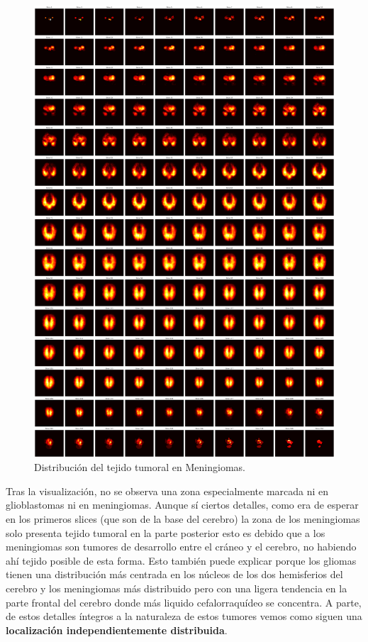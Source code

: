 \begin{figure}[H]
	\centering
	\includegraphics[width=1.0\linewidth]{imagenes/metodologia_heatmapsMEN.png}
	\caption{Distribución del tejido tumoral en Meningiomas.}
\end{figure}


Tras la visualización, no se observa una zona especialmente marcada ni en glioblastomas ni en meningiomas. Aunque sí ciertos detalles, como era de esperar en los primeros slices (que son de la base del cerebro) la zona de los meningiomas solo presenta tejido tumoral en la parte posterior esto es debido que a los meningiomas son tumores de desarrollo entre el cráneo y el cerebro, no habiendo ahí tejido posible de esta forma. Esto también puede explicar porque los gliomas tienen una distribución más centrada en los núcleos de los dos hemisferios del cerebro y los meningiomas más distribuido pero con una ligera tendencia en la parte frontal del cerebro donde más liquido cefalorraquídeo se concentra. A parte, de estos detalles íntegros a la naturaleza de estos tumores vemos como siguen una \textbf{localización independientemente distribuida}. 

